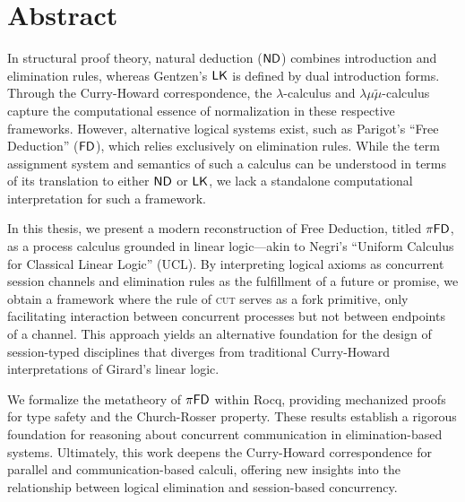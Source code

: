 \begingroup
\let\clearpage\relax
\let\cleardoublepage\relax
\let\cleardoublepage\relax

\chapter*{Abstract}
In structural proof theory, natural deduction ($\textsf{ND}$) combines introduction and elimination rules,
whereas Gentzen's $\textsf{LK}$ is defined by dual introduction forms.
Through the Curry-Howard correspondence, the $\lambda$-calculus and $\lambda\mu\tilde{\mu}$-calculus
capture the computational essence of normalization in these respective frameworks.
However, alternative logical systems exist, such as Parigot's \enquote{Free Deduction} ($\textsf{FD}$),
which relies exclusively on elimination rules.
While the term assignment system and semantics of such a calculus can be understood
in terms of its translation to either $\textsf{ND}$ or $\textsf{LK}$, we lack a standalone
computational interpretation for such a framework.

In this thesis, we present a modern reconstruction of Free Deduction,
titled $\pi\textsf{FD}$, as a process calculus grounded in linear logic---akin
to Negri's \enquote{Uniform Calculus for Classical Linear Logic} (UCL).
By interpreting logical axioms as concurrent session channels and elimination
rules as the fulfillment of a future or promise,
we obtain a framework where the rule of
\textsc{cut} serves as a fork primitive, only facilitating interaction between
concurrent processes but not between endpoints of a channel.
This approach yields an alternative foundation for the design of session-typed disciplines that
diverges from traditional Curry-Howard interpretations of Girard's linear logic.

We formalize the metatheory of $\pi\textsf{FD}$ within Rocq, providing mechanized
proofs for type safety and the Church-Rosser property.
These results establish a rigorous foundation for reasoning about concurrent
communication in elimination-based systems.
Ultimately, this work deepens the Curry-Howard correspondence for parallel and
communication-based calculi, offering new insights into the relationship
between logical elimination and session-based concurrency.

\endgroup

\vfill